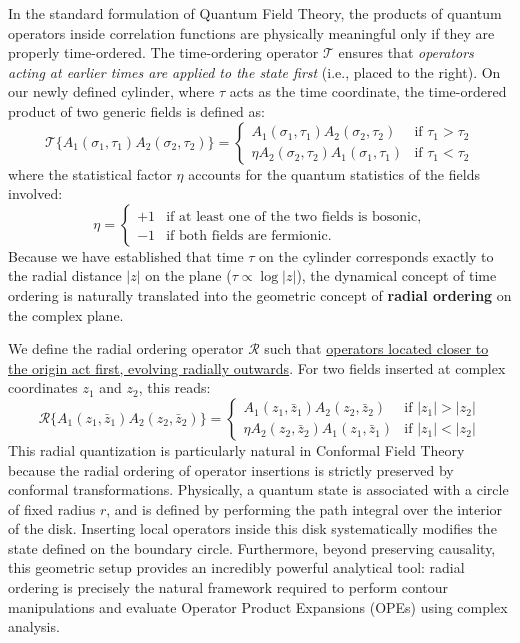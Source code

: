In the standard formulation of Quantum Field Theory, the products of quantum operators inside correlation functions are physically meaningful only if they are properly time-ordered. The time-ordering operator \(\mathcal{T}\) ensures that \textit{operators acting at earlier times are applied to the state first} (i.e., placed to the right). On our newly defined cylinder, where \(\tau\) acts as the time coordinate, the time-ordered product of two generic fields is defined as:
\[
    \mathcal{T} \{ A_1(\sigma_1, \tau_1) A_2(\sigma_2, \tau_2) \} =
    \begin{cases}
        A_1(\sigma_1, \tau_1) A_2(\sigma_2, \tau_2)      & \text{if } \tau_1 > \tau_2 \\
        \eta A_2(\sigma_2, \tau_2) A_1(\sigma_1, \tau_1) & \text{if } \tau_1 < \tau_2
    \end{cases}
\]
where the statistical factor \(\eta\) accounts for the quantum statistics of the fields involved:
\[
    \eta =
    \begin{cases}
        +1 & \text{if at least one of the two fields is bosonic,} \\
        -1 & \text{if both fields are fermionic.}
    \end{cases}
\]
Because we have established that time \(\tau\) on the cylinder corresponds exactly to the radial distance \(|z|\) on the plane (\(\tau \propto \log|z|\)), the dynamical concept of time ordering is naturally translated into the geometric concept of \textbf{radial ordering} on the complex plane.

We define the radial ordering operator \(\mathcal{R}\) such that \uline{operators located closer to the origin act first, evolving radially outwards}. For two fields inserted at complex coordinates \(z_1\) and \(z_2\), this reads:
\[
    \mathcal{R} \{ A_1(z_1, \bar{z}_1) A_2(z_2, \bar{z}_2) \} =
    \begin{cases}
        A_1(z_1, \bar{z}_1) A_2(z_2, \bar{z}_2)      & \text{if } |z_1| > |z_2| \\
        \eta A_2(z_2, \bar{z}_2) A_1(z_1, \bar{z}_1) & \text{if } |z_1| < |z_2|
    \end{cases}
\]
This radial quantization is particularly natural in Conformal Field Theory because the radial ordering of operator insertions is strictly preserved by conformal transformations. Physically, a quantum state is associated with a circle of fixed radius \(r\), and is defined by performing the path integral over the interior of the disk. Inserting local operators inside this disk systematically modifies the state defined on the boundary circle. Furthermore, beyond preserving causality, this geometric setup provides an incredibly powerful analytical tool: radial ordering is precisely the natural framework required to perform contour manipulations and evaluate Operator Product Expansions (OPEs) using complex analysis.

